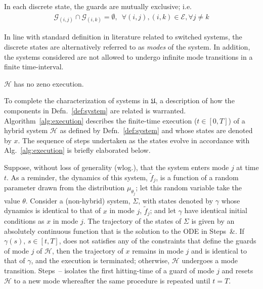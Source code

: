 \begin{assump}
    In each discrete state, the guards are mutually exclusive; i.e.
    \begin{align}
    \mathcal G_{(i,j)}\cap \mathcal G_{(i,k)}=\emptyset,\phantom{8}\forall (i,j),(i,k)\in \mathcal E, \forall j\ne k
    \end{align}
\end{assump}
In line with standard definition in literature related to switched systems, the discrete states are alternatively referred to as {\em modes} of the system. In addition, the systems considered are not allowed to undergo infinite mode transitions in a finite time-interval.
\begin{assump}
  $\mathcal H$ has no zeno execution.
  \label{assump:zeno}
\end{assump}
To complete the characterization of systems in $\mathfrak{U}$, a description of how the components in Defn.~\ref{def:system} are related is warranted. Algorithm~\ref{alg:execution} describes the finite-time execution ($t\in [0,T]$) of a hybrid system $\mathcal H$ as defined by Defn.~\ref{def:system} and whose states are denoted by $x$. The sequence of steps undertaken as the states evolve in accordance with Alg.~\ref{alg:execution} is briefly elaborated below.
\par
Suppose, without loss of generality (wlog.), that the system enters mode $j$ at time $t$. As a reminder, the dynamics of this system, $\tilde f_j$, is a function of a random parameter drawn from the distribution $\mu_{\theta_j}$; let this random variable take the value $\theta$. Consider a (non-hybrid) system, $\Sigma$, with states denoted by $\gamma$ whose dynamics is identical to that of $x$ in mode $j$, $\tilde f_j$; and let $\gamma$ have identical initial conditions as $x$ in mode $j$. The trajectory of the states of $\Sigma$ is given by an absolutely continuous function that is the solution to the ODE in Steps~\&. If $\gamma(s),\,s\in [t,T]$, does not satisfies any of the constraints that define the guards of mode $j$ of $\mathcal H$, then the trajectory of $x$ remains in mode $j$ and is identical to that of $\gamma$, and the execution is terminated; otherwise, $\mathcal H$ undergoes a mode transition. Steps~-- isolates the first hitting-time of a guard of mode $j$ and resets $\mathcal H$ to a new mode whereafter the same procedure is repeated until $t=T$.
\par
